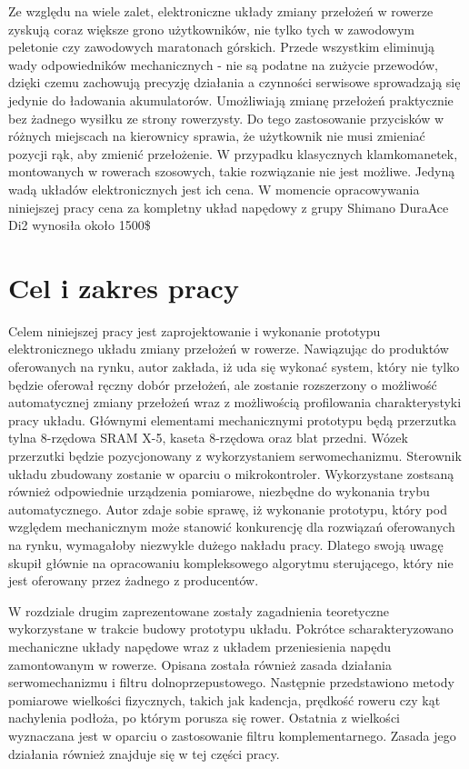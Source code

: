 Ze względu na wiele zalet, elektroniczne układy zmiany przełożeń w rowerze zyskują coraz większe grono użytkowników, nie tylko tych w zawodowym peletonie czy zawodowych maratonach górskich. Przede wszystkim eliminują wady odpowiedników mechanicznych - nie są podatne na zużycie przewodów, dzięki czemu zachowują precyzję działania a czynności serwisowe sprowadzają się jedynie do ładowania akumulatorów. Umożliwiają zmianę przełożeń praktycznie bez żadnego wysiłku ze strony rowerzysty. Do tego zastosowanie przycisków w różnych miejscach na kierownicy sprawia, że użytkownik nie musi zmieniać pozycji rąk, aby zmienić przełożenie. W przypadku klasycznych klamkomanetek, montowanych w rowerach szosowych, takie rozwiązanie nie jest możliwe. Jedyną wadą układów elektronicznych jest ich cena. W momencie opracowywania niniejszej pracy cena za kompletny układ napędowy z grupy Shimano DuraAce Di2 wynosiła około 1500\$

\section{Cel i zakres pracy}
\label{sec:Cel Pracy}
Celem niniejszej pracy jest zaprojektowanie i wykonanie prototypu elektronicznego układu zmiany przełożeń w rowerze. Nawiązując do produktów oferowanych na rynku, autor zakłada, iż uda się wykonać system, który nie tylko będzie oferował ręczny dobór przełożeń, ale zostanie rozszerzony o możliwość automatycznej zmiany przełożeń wraz z możliwością profilowania charakterystyki pracy układu. Głównymi elementami mechanicznymi prototypu będą przerzutka tylna 8-rzędowa SRAM X-5, kaseta 8-rzędowa oraz blat przedni. Wózek przerzutki będzie pozycjonowany z wykorzystaniem serwomechanizmu. Sterownik układu zbudowany zostanie w oparciu o mikrokontroler. Wykorzystane zostsaną również odpowiednie urządzenia pomiarowe, niezbędne do wykonania trybu automatycznego. Autor zdaje sobie sprawę, iż wykonanie prototypu, który pod względem mechanicznym może stanowić konkurencję dla rozwiązań oferowanych na rynku, wymagałoby niezwykle dużego nakładu pracy. Dlatego swoją uwagę skupił głównie na opracowaniu kompleksowego algorytmu sterującego, który nie jest oferowany przez żadnego z producentów.

W rozdziale drugim zaprezentowane zostały zagadnienia teoretyczne wykorzystane w trakcie budowy prototypu układu. Pokrótce scharakteryzowano mechaniczne układy napędowe wraz z układem przeniesienia napędu zamontowanym w rowerze. Opisana została również zasada działania serwomechanizmu i filtru dolnoprzepustowego. Następnie przedstawiono metody pomiarowe wielkości fizycznych, takich jak kadencja, prędkość roweru czy kąt nachylenia podłoża, po którym porusza się rower. Ostatnia z wielkości wyznaczana jest w oparciu o zastosowanie filtru komplementarnego. Zasada jego działania również znajduje się w tej części pracy.

